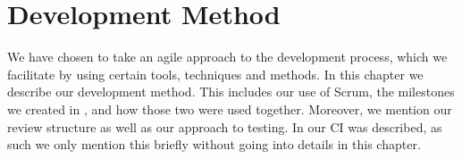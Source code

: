 \chapter{Development Method}\label{cha:development_method}
We have chosen to take an agile approach to the development process, which we facilitate by using certain tools, techniques and methods.
In this chapter we describe our development method.
This includes our use of Scrum, the milestones we created in , and how those two were used together.
Moreover, we mention our review structure as well as our approach to testing.
In  our \ac{CI} was described, as such we only mention this briefly without going into details in this chapter.

